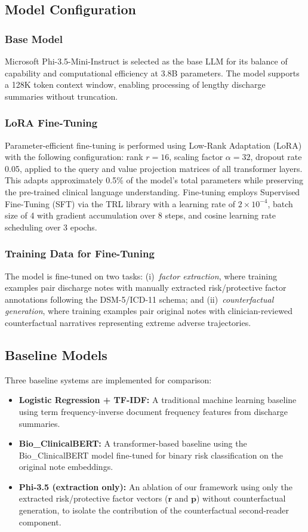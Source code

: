 \documentclass[conference]{IEEEtran}
\begin{document}
\subsection{Model Configuration}

\subsubsection{Base Model}
Microsoft Phi-3.5-Mini-Instruct is selected as the base LLM for its balance of capability and computational efficiency at 3.8B parameters. The model supports a 128K token context window, enabling processing of lengthy discharge summaries without truncation.

\subsubsection{LoRA Fine-Tuning}
Parameter-efficient fine-tuning is performed using Low-Rank Adaptation (LoRA) \cite{b19} with the following configuration: rank $r = 16$, scaling factor $\alpha = 32$, dropout rate 0.05, applied to the query and value projection matrices of all transformer layers. This adapts approximately 0.5\% of the model's total parameters while preserving the pre-trained clinical language understanding. Fine-tuning employs Supervised Fine-Tuning (SFT) via the TRL library with a learning rate of $2 \times 10^{-4}$, batch size of 4 with gradient accumulation over 8 steps, and cosine learning rate scheduling over 3 epochs.

\subsubsection{Training Data for Fine-Tuning}
The model is fine-tuned on two tasks: (i)~\textit{factor extraction}, where training examples pair discharge notes with manually extracted risk/protective factor annotations following the DSM-5/ICD-11 schema; and (ii)~\textit{counterfactual generation}, where training examples pair original notes with clinician-reviewed counterfactual narratives representing extreme adverse trajectories.

\subsection{Baseline Models}
Three baseline systems are implemented for comparison:
\begin{itemize}
\item \textbf{Logistic Regression + TF-IDF:} A traditional machine learning baseline using term frequency-inverse document frequency features from discharge summaries.
\item \textbf{Bio\_ClinicalBERT:} A transformer-based baseline using the Bio\_ClinicalBERT model \cite{b20} fine-tuned for binary risk classification on the original note embeddings.
\item \textbf{Phi-3.5 (extraction only):} An ablation of our framework using only the extracted risk/protective factor vectors ($\mathbf{r}$ and $\mathbf{p}$) without counterfactual generation, to isolate the contribution of the counterfactual second-reader component.
\end{itemize}
\end{document}

